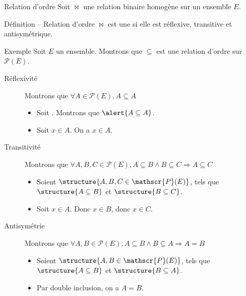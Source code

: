 
\begingroup

\begin{frame}{Relation d'ordre}
  Soit $\bowtie$ une relation binaire homogène sur un ensemble $E$.

  \begin{block}{Définition -- Relation d'ordre}
    $\bowtie$ est une  si elle est \alert{réflexive}, \alert{transitive} et \alert{antisymétrique}.
  \end{block}
  \begin{exampleblock}{Exemple}
    Soit $E$ un ensemble. 
    Montrons que $\subseteq$ est une relation d'ordre sur $\mathscr{P}(E)$.
    \begin{description}
    \item[Réflexivité]  Montrons que \alert{$\forall A\in \mathscr{P}(E), A\subseteq A$}
      \begin{itemize}
      \item Soit . Montrons que $\alert{A\subseteq A}$.
      \item Soit $x\in A$. On a $x\in A$.
      \end{itemize}
    \item[Transitivité] Montrons que \alert{$\forall A, B, C \in \mathscr{P}(E), A \subseteq B \land B \subseteq C \Rightarrow A \subseteq C$}
      \begin{itemize}
      \item Soient $\structure{A, B, C \in \mathscr{P}(E)}$, tels que $\structure{A \subseteq B}$ et $\structure{B \subseteq C}$. 
      \item Soit $x \in A$. Donc $x\in B$, donc $x\in C$. 
      \end{itemize}
    \item[Antisymétrie] Montrons que \alert{$\forall A,B \in \mathscr{P}(E), A \subseteq B \land B \subseteq A \Rightarrow A=B$}
      \begin{itemize}
      \item Soient $\structure{A, B \in \mathscr{P}(E)}$, tels que $\structure{A \subseteq B}$ et $\structure{B \subseteq A}$. 
      \item Par double inclusion, on a $A=B$. 
      \end{itemize}
    \end{description}
  \end{exampleblock}
\end{frame}
\endgroup
